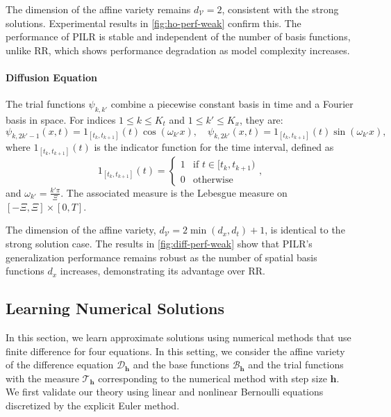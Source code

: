 \documentclass{article}
\theoremstyle{plain}
\theoremstyle{definition}
\theoremstyle{remark}
\begin{document}
The dimension of the affine variety remains $d_{\mathcal{V}} = 2$, consistent with the strong solutions. Experimental results in \cref{fig:ho-perf-weak} confirm this. The performance of PILR is stable and independent of the number of basis functions, unlike RR, which shows performance degradation as model complexity increases.

\paragraph{Diffusion Equation}
The trial functions $\psi_{k, k'}$ combine a piecewise constant basis in time and a Fourier basis in space. For indices $1 \leq k \leq K_t$ and $1 \leq k' \leq K_x$, they are:
\begin{equation}
    \psi_{k, 2k'-1}(x,t) = 1_{[t_k, t_{k+1}]}(t) \cos(\omega_{k'} x), \quad \psi_{k, 2k'}(x,t) = 1_{[t_k, t_{k+1}]}(t) \sin(\omega_{k'} x),
\end{equation}
where $1_{[t_k, t_{k+1}]}(t)$ is the indicator function for the time interval, defined as
\begin{equation}
    1_{[t_k, t_{k+1}]}(t) = 
    \begin{cases} 
        1 & \text{if } t \in [t_k, t_{k+1}) \\ 
        0 & \text{otherwise} 
    \end{cases},
\end{equation}
and $\omega_{k'} = \frac{k'\pi}{\Xi}$. The associated measure is the Lebesgue measure on $[-\Xi, \Xi] \times [0, T]$.

The dimension of the affine variety, $d_{\mathcal{V}} = 2 \min(d_x, d_t) + 1$, is identical to the strong solution case. The results in \cref{fig:diff-perf-weak} show that PILR's generalization performance remains robust as the number of spatial basis functions $d_x$ increases, demonstrating its advantage over RR.

\subsection{Learning Numerical Solutions}
\label{sec:numel-sol}
In this section, we learn approximate solutions using numerical methods that use finite difference for four equations. In this setting, we consider the affine variety of the difference equation \(\mathscr{D}_{\bm{h}}\) and the base functions \(\mathcal{B}_{\bm{h}}\) and the trial functions with the measure \(\mathcal{T}_{\bm{h}}\) corresponding to the numerical method with step size \(\bm{h}\). We first validate our theory using linear and nonlinear Bernoulli equations discretized by the explicit Euler method. 
\end{document}
